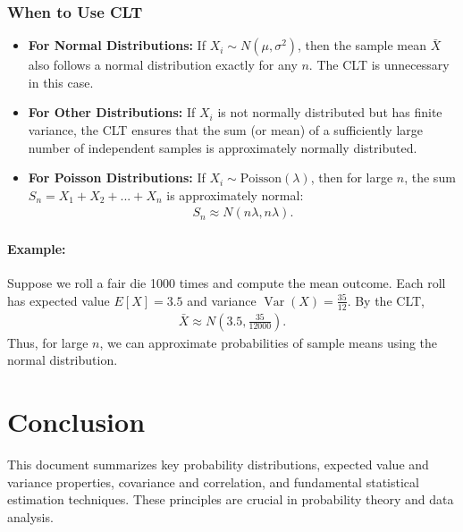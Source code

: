 \documentclass[12pt]{article}
\begin{document}
\subsubsection{When to Use CLT}
\begin{itemize}
    \item \textbf{For Normal Distributions:} If $X_i \sim N(\mu, \sigma^2)$, then the sample mean $\bar{X}$ also follows a normal distribution exactly for any $n$. The CLT is unnecessary in this case.
    \item \textbf{For Other Distributions:} If $X_i$ is not normally distributed but has finite variance, the CLT ensures that the sum (or mean) of a sufficiently large number of independent samples is approximately normally distributed.
    \item \textbf{For Poisson Distributions:} If $X_i \sim \text{Poisson}(\lambda)$, then for large $n$, the sum $S_n = X_1 + X_2 + ... + X_n$ is approximately normal:
    \begin{align*}
        S_n \approx N(n\lambda, n\lambda).
    \end{align*}
\end{itemize}

\paragraph{Example:} Suppose we roll a fair die 1000 times and compute the mean outcome. Each roll has expected value $E[X] = 3.5$ and variance $\operatorname{Var}(X) = \frac{35}{12}$. By the CLT,
\begin{align*}
    \bar{X} \approx N\left(3.5, \frac{35}{12000}\right).
\end{align*}
Thus, for large $n$, we can approximate probabilities of sample means using the normal distribution.

\section{Conclusion}
This document summarizes key probability distributions, expected value and variance properties, covariance and correlation, and fundamental statistical estimation techniques. These principles are crucial in probability theory and data analysis.
\end{document}
